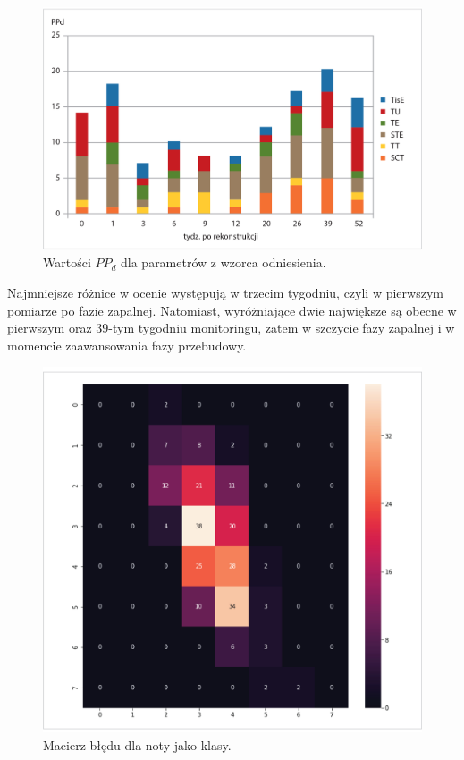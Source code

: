 \begin{figure}[h!]
	\centering
	\includegraphics[width=1\textwidth]{figures/cm_summary.jpg}
	\caption{Wartości $PP_d$ dla parametrów z wzorca odniesienia.}\label{fig:CM_MAE_SUMMARY}
\end{figure}

Najmniejsze różnice w ocenie występują w trzecim tygodniu, czyli w pierwszym pomiarze po fazie zapalnej. Natomiast, wyróżniające dwie największe są obecne \linebreak w pierwszym oraz 39-tym tygodniu monitoringu, zatem w szczycie fazy zapalnej \linebreak i w momencie zaawansowania fazy przebudowy. 
\begin{figure}[b!]
	\centering
	\includegraphics[width=1\textwidth]{figures/cmScores.jpg}
	\caption{Macierz błędu dla noty jako klasy.}\label{fig:cmscores}
\end{figure}

